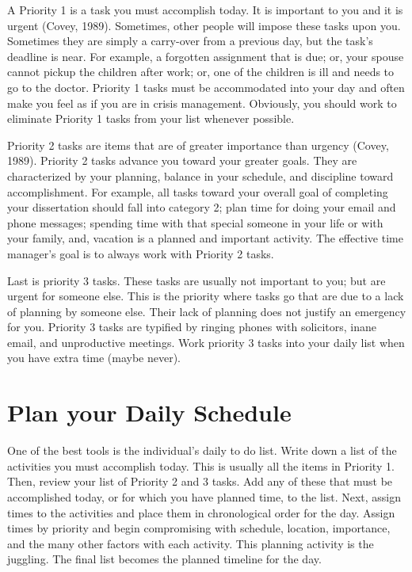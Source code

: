 \documentclass[twocolumn]{article}
\begin{document}
A Priority 1 is a task you must accomplish today. It is important to you and it
is urgent (Covey, 1989). Sometimes, other people will impose these tasks upon you.
Sometimes they are simply a carry-over from a previous day, but the task’s
deadline is near. For example, a forgotten assignment that is due; or, your
spouse cannot pickup the children after work; or, one of the children is ill and
needs to go to the doctor. Priority 1 tasks must be accommodated into your day
and often make you feel as if you are in crisis management. Obviously, you should
work to eliminate Priority 1 tasks from your list whenever possible.

Priority 2 tasks are items that are of greater importance than urgency
(Covey, 1989). Priority 2 tasks advance you toward your greater goals. They are
characterized by your planning, balance in your schedule, and discipline toward
accomplishment. For example, all tasks toward your overall goal of completing
your dissertation should fall into category 2; plan time for doing your email
and phone messages; spending time with that special someone in your life or with
your family, and, vacation is a planned and important activity. The effective
time manager’s goal is to always work with Priority 2 tasks.

Last is priority 3 tasks. These tasks are usually not important to you; but are
urgent for someone else. This is the priority where tasks go that are due to a
lack of planning by someone else. Their lack of planning does not justify an
emergency for you. Priority 3 tasks are typified by ringing phones with
solicitors, inane email, and unproductive meetings. Work priority 3 tasks
into your daily list when you have extra time (maybe never).

\section*{Plan your Daily Schedule}
\noindent
One of the best tools is the individual's daily to do list. Write down a list of
the activities you must accomplish today. This is usually all the items in
Priority 1. Then, review your list of Priority 2 and 3 tasks. Add any of these
that must be accomplished today, or for which you have planned time, to the list.
Next, assign times to the activities and place them in chronological order for
the day. Assign times by priority and begin compromising with schedule, location,
importance, and the many other factors with each activity. This planning
activity is the juggling. The final list becomes the planned timeline for the day.
\end{document}
